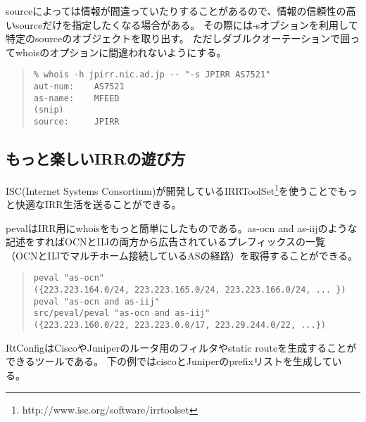 sourceによっては情報が間違っていたりすることがあるので、情報の信頼性の高いsourceだけを指定したくなる場合がある。
その際には-sオプションを利用して特定のsourceのオブジェクトを取り出す。
ただしダブルクオーテーションで囲ってwhoisのオプションに間違われないようにする。

\begin{quote}
\begin{minilinespace}
\begin{verbatim}
% whois -h jpirr.nic.ad.jp -- "-s JPIRR AS7521"
aut-num:    AS7521
as-name:    MFEED
(snip)
source:     JPIRR
\end{verbatim}
\end{minilinespace}
\end{quote}

\newpage

\subsection{もっと楽しいIRRの遊び方}

ISC(Internet Systems Consortium)が開発しているIRRToolSet\footnote{http://www.isc.org/software/irrtoolset}を使うことでもっと快適なIRR生活を送ることができる。

pevalはIRR用にwhoisをもっと簡単にしたものである。as-ocn and as-iijのような記述をすればOCNとIIJの両方から広告されているプレフィックスの一覧
（OCNとIIJでマルチホーム接続しているASの経路）を取得することができる。

\begin{quote}
\begin{minilinespace}
\begin{verbatim}
peval "as-ocn"
({223.223.164.0/24, 223.223.165.0/24, 223.223.166.0/24, ... })
peval "as-ocn and as-iij"
src/peval/peval "as-ocn and as-iij"
({223.223.160.0/22, 223.223.0.0/17, 223.29.244.0/22, ...})
\end{verbatim}
\end{minilinespace}
\end{quote}

RtConfigはCiscoやJuniperのルータ用のフィルタやstatic routeを生成することができるツールである。
下の例ではciscoとJuniperのprefixリストを生成している。

